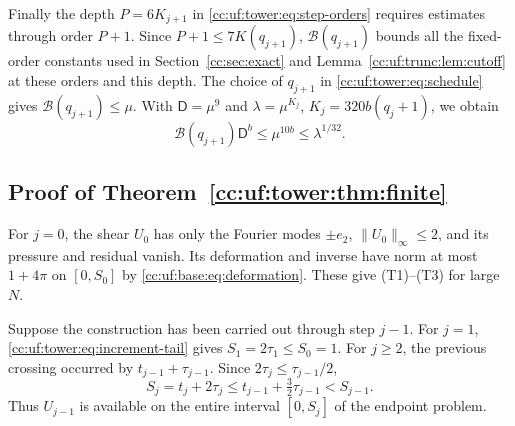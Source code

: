 Finally the depth $P=6K_{j+1}$ in \eqref{cc:uf:tower:eq:step-orders}
requires estimates through order $P+1$. Since $P+1\le7K(q_{j+1})$,
$\mathcal B(q_{j+1})$ bounds all the fixed-order constants used in
Section~\ref{cc:sec:exact} and Lemma~\ref{cc:uf:trunc:lem:cutoff}
at these orders and this depth.
The choice of $q_{j+1}$ in \eqref{cc:uf:tower:eq:schedule} gives
$\mathcal B(q_{j+1})\le\mu$. With $\mathsf D=\mu^9$ and
$\lambda=\mu^{K_j}$, $K_j=320b(q_j+1)$, we obtain
\begin{equation}\label{cc:par:step}
 \mathcal B(q_{j+1})\mathsf D^b\le\mu^{10b}\le\lambda^{1/32}.
\end{equation}

\subsection{Proof of Theorem~\ref{cc:uf:tower:thm:finite}}

For $j=0$, the shear $U_0$ has only the Fourier modes $\pm e_2$,
$\|U_0\|_\infty\le2$, and its pressure and residual vanish. Its
deformation and inverse have norm at most $1+4\pi$ on $[0,S_0]$
by \eqref{cc:uf:base:eq:deformation}. These give \textup{(T1)}--\textup{(T3)}
for large $N$.

Suppose the construction has been carried out through step $j-1$.
For $j=1$, \eqref{cc:uf:tower:eq:increment-tail} gives
$S_1=2\tau_1\le S_0=1$. For $j\ge2$, the previous crossing occurred
by $t_{j-1}+\tau_{j-1}$. Since $2\tau_j\le\tau_{j-1}/2$,
\[
 S_j=t_j+2\tau_j\le t_{j-1}+\tfrac32\tau_{j-1}<S_{j-1}.
\]
Thus $U_{j-1}$ is available on the entire interval $[0,S_j]$ of
the endpoint problem.

